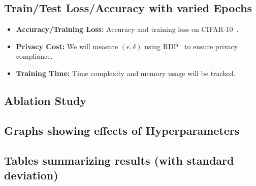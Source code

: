 \subsection{Train/Test Loss/Accuracy with varied Epochs}\label{subsec:train-testloss-accuracy}
\begin{itemize}
    \item \textbf{Accuracy/Training Loss:} Accuracy and training loss on CIFAR-10~\cite{cifar10_dataset}.
    \item \textbf{Privacy Cost:} We will measure $(\epsilon, \delta)$ using RDP~\cite{Mironov_2017_RenyiDP} to ensure privacy compliance.
    \item \textbf{Training Time:} Time complexity and memory usage will be tracked.
\end{itemize}

\subsection{Ablation Study}\label{subsec:ablation-study}

\subsection{Graphs showing effects of Hyperparameters}\label{subsec:graphs-hyperparamters}

\subsection{Tables summarizing results (with standard deviation)}\label{subsec:summary-table-results}
